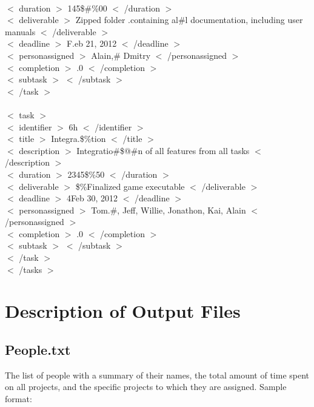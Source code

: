 \documentclass[12pt]{article}
\newcommand{\tab}{\hspace*{2em}}
\begin{document}
{\\ \tab    \tab $<$ duration $>$ 145\$\#\%00 $<$ /duration $>$ 
\\ \tab    \tab $<$ deliverable $>$ Zipped folder .containing al\#l documentation, including user manuals $<$ /deliverable $>$ 
\\ \tab    \tab $<$ deadline $>$ F.eb 21, 2012 $<$ /deadline $>$ 
\\ \tab    \tab $<$ personassigned $>$ Alain,\# Dmitry $<$ /personassigned $>$ 
\\ \tab    \tab $<$ completion $>$ .0 $<$ /completion $>$ 
\\ \tab    \tab $<$ subtask $>$  $<$ /subtask $>$ 
\\ \tab$<$ /task $>$ 
\\ 
\\ \tab$<$ task $>$ 
\\ \tab    \tab $<$ identifier $>$ 6h $<$ /identifier $>$ 
\\ \tab    \tab $<$ title $>$ Integra.\$\%tion $<$ /title $>$ 
\\ \tab    \tab $<$ description $>$ Integratio\#\$@\#n of all features from all tasks $<$ /description $>$ 
\\ \tab    \tab $<$ duration $>$ 2345\$\%50 $<$ /duration $>$ 
\\ \tab    \tab $<$ deliverable $>$ \$\%Finalized game executable $<$ /deliverable $>$ 
\\ \tab    \tab $<$ deadline $>$ 4Feb 30, 2012 $<$ /deadline $>$ 
\\ \tab    \tab $<$ personassigned $>$ Tom.\#, Jeff, Willie, Jonathon, Kai, Alain $<$ /personassigned $>$ 
\\ \tab    \tab $<$ completion $>$ .0 $<$ /completion $>$ 
\\ \tab    \tab $<$ subtask $>$  $<$ /subtask $>$ 
\\ \tab$<$ /task $>$ 
\\ $<$ /tasks $>$ 
}

\section{Description of Output Files}
\subsection{People.txt}

The list of people with a summary of their names, the total amount of time spent on all projects, and the specific projects to which they are assigned. Sample format:
\end{document}
